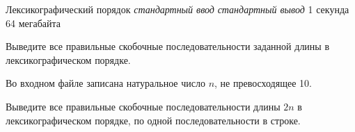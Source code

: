 \begin{problem}%
{Лексикографический порядок}%
{\textsl{стандартный ввод}}%
{\textsl{стандартный вывод}}%
{1 секунда}%
{64 мегабайта}{}

Выведите все правильные скобочные последовательности заданной длины в лексикографическом порядке.

\InputFile

Во входном файле записана натуральное число $n$, не превосходящее 10.

\OutputFile

Выведите все правильные скобочные последовательности длины $2n$ в лексикографическом порядке, по одной последовательности в строке.

\Examples

\begin{example}
%
\end{example}
\end{problem}